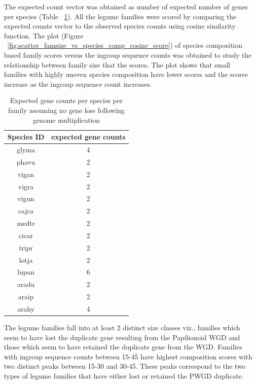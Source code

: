 \documentclass{article}
\begin{document}
		The expected count vector was obtained as number of expected number of genes per species (Table  ~\ref{tab:exp_gene_count_table}). All the legume families were scored by comparing the expected counts vector to the observed species counts using cosine similarity function. The plot (Figure ~\ref{fig:scatter_famsize_vs_species_comp_cosine_score}) of species composition based family scores versus the ingroup sequence counts was obtained to study the relationship between family size that the scores. The plot shows that small families with highly uneven species composition have lower scores and the scores increase as the ingroup sequence count increases.
		
		\begin{table}[h!]
			\centering
			\begin{tabular}{|c |c |} 
				\hline
				Species ID & expected gene counts \\
				\hline\hline
				glyma & 4 \\ 
				\hline
				phavu & 2 \\
				\hline
				vigan & 2 \\
				\hline
				vigra & 2 \\
				\hline
				vigun & 2 \\ 
				\hline
				cajca & 2 \\
				\hline
				medtr & 2 \\
				\hline
				cicar & 2 \\
				\hline
				tripr & 2 \\
				\hline
				lotja & 2 \\
				\hline
				lupan & 6 \\
				\hline
				aradu & 2 \\
				\hline
				araip & 2 \\
				\hline
				arahy & 4 \\
				\hline
			\end{tabular}
			\caption{Expected gene counts per species per family assuming no gene loss following genome multiplication}
			\label{tab:exp_gene_count_table}
		\end{table}
		
		
		The legume families fall into at least 2 distinct size classes viz., families which seem to have lost the duplicate gene resulting from the Papilionoid WGD and those which seem to have retained the duplicate gene from the WGD. Families with ingroup sequence counts between 15-45 have highest composition scores with two distinct peaks between 15-30 and  30-45. These peaks correspond to the two types of legume families that have either lost or retained the PWGD duplicate.
		
\end{document}

